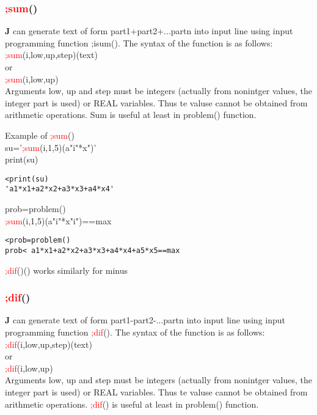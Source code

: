 \subsubsection{\textcolor{Red}{;sum}()}
\label{inpusum}
\textbf{J} can generate text of form part1+part2+...partn into input line using
input programming function ;isum(). The syntax of the function is as follows:\\
\textcolor{Red}{;sum}(i,low,up,step)(text)\\
or \\
\textcolor{Red}{;sum}(i,low,up)\\
Arguments low, up and step must be integers (actually from nonintger values, the
integer part is used) or REAL variables. Thus te valuse cannot be obtained
from arithmetic operations. Sum is useful at least in \textcolor{VioletRed}{problem}() function.
\begin{example}[inpusumex]Example of \textcolor{Red}{;sum}()\\
\label{inpusumex}
su='\textcolor{Red}{;sum}(i,1,5)(a"i"*x")'\\
\textcolor{VioletRed}{print}(su)
\color{Green}
\begin{verbatim}
<print(su)
'a1*x1+a2*x2+a3*x3+a4*x4'
\end{verbatim}
\color{Black}
prob=\textcolor{VioletRed}{problem}()\\
\textcolor{Red}{;sum}(i,1,5)(a"i"*x"i")==max
\color{Green}
\begin{verbatim}
<prob=problem()
prob< a1*x1+a2*x2+a3*x3+a4*x4+a5*x5==max
\end{verbatim}
\color{Black}
\end{example}
\begin{note}
\textcolor{Red}{;dif}()() works similarly for minus
\end{note}
\subsubsection{\textcolor{Red}{;dif}()}
\label{inpudif}
\textbf{J} can generate text of form part1-part2-...partn into input line using
input programming function \textcolor{Red}{;dif}(). The syntax of the function is as follows:\\
\textcolor{Red}{;dif}(i,low,up,step)(text)\\
or \\
\textcolor{Red}{;dif}(i,low,up)\\
Arguments low, up and step must be integers (actually from nonintger values, the
integer part is used) or REAL variables. Thus te valuse cannot be obtained
from arithmetic operations. \textcolor{Red}{;dif}() is useful at least in \textcolor{VioletRed}{problem}() function.

